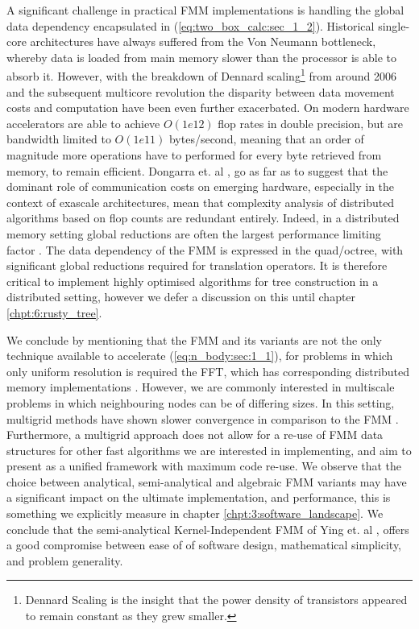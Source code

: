 A significant challenge in practical FMM implementations is handling the global data dependency encapsulated in (\ref{eq:two_box_calc:sec_1_2}). Historical single-core architectures have always suffered from the Von Neumann bottleneck, whereby data is loaded from main memory slower than the processor is able to absorb it. However, with the breakdown of Dennard scaling\footnote{Dennard Scaling is the insight that the power density of transistors appeared to remain constant as they grew smaller.} from around 2006 and the subsequent multicore revolution the disparity between data movement costs and computation have been even further exacerbated. On modern hardware accelerators are able to achieve $O(1e12)$ flop rates in double precision, but are bandwidth limited to $O(1e11)$ bytes/second, meaning that an order of magnitude more operations have to performed for every byte retrieved from memory, to remain efficient. Dongarra et. al \cite{dongarra2017extreme}, go as far as to suggest that the dominant role of communication costs on emerging hardware, especially in the context of exascale architectures, mean that complexity analysis of distributed algorithms based on flop counts are redundant entirely. Indeed, in a distributed memory setting global reductions are often the largest performance limiting factor \cite{dongarra2017extreme}. The data dependency of the FMM is expressed in the quad/octree, with significant global reductions required for translation operators. It is therefore critical to implement highly optimised algorithms for tree construction in a distributed setting, however we defer a discussion on this until chapter \ref{chpt:6:rusty_tree}.

We conclude by mentioning that the FMM and its variants are not the only technique available to accelerate (\ref{eq:n_body:sec:1_1}), for problems in which only uniform resolution is required the FFT, which has corresponding distributed memory implementations \cite{gholami2015accfft}. However, we are commonly interested in multiscale problems in which neighbouring nodes can be of differing sizes. In this setting, multigrid methods have shown slower convergence in comparison to the FMM \cite{yokota2015fast,gholami2016fft}. Furthermore, a multigrid approach does not allow for a re-use of FMM data structures for other fast algorithms we are interested in implementing, and aim to present as a unified framework with maximum code re-use. We observe that the choice between analytical, semi-analytical and algebraic FMM variants may have a significant impact on the ultimate implementation, and performance, this is something we explicitly measure in chapter \ref{chpt:3:software_landscape}. We conclude that the semi-analytical Kernel-Independent FMM of Ying et. al \cite{Ying:2004:JCP}, offers a good compromise between ease of of software design, mathematical simplicity, and problem generality.

